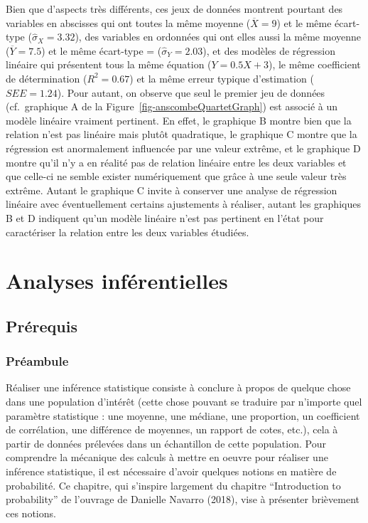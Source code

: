\documentclass[
  letterpaper,
]{book}
\begin{document}
Bien que d'aspects très différents, ces jeux de données montrent
pourtant des variables en abscisses qui ont toutes la même moyenne
(\(\overline{X} = 9\)) et le même écart-type
(\(\hat{\sigma}_{X} = 3.32\)), des variables en ordonnées qui ont elles
aussi la même moyenne (\(\overline{Y} = 7.5\)) et le même écart-type =
(\(\hat{\sigma}_{Y} = 2.03\)), et des modèles de régression linéaire qui
présentent tous la même équation (\(Y = 0.5X + 3\)), le même coefficient
de détermination (\(R^2 = 0.67\)) et la même erreur typique d'estimation
(\(SEE = 1.24\)). Pour autant, on observe que seul le premier jeu de
données (cf.~graphique A de la Figure~\ref{fig-anscombeQuartetGraph})
est associé à un modèle linéaire vraiment pertinent. En effet, le
graphique B montre bien que la relation n'est pas linéaire mais plutôt
quadratique, le graphique C montre que la régression est anormalement
influencée par une valeur extrême, et le graphique D montre qu'il n'y a
en réalité pas de relation linéaire entre les deux variables et que
celle-ci ne semble exister numériquement que grâce à une seule valeur
très extrême. Autant le graphique C invite à conserver une analyse de
régression linéaire avec éventuellement certains ajustements à réaliser,
autant les graphiques B et D indiquent qu'un modèle linéaire n'est pas
pertinent en l'état pour caractériser la relation entre les deux
variables étudiées.

\part{Analyses inférentielles}

\chapter{Prérequis}\label{pruxe9requis-1}

\section{Préambule}\label{pruxe9ambule}

Réaliser une inférence statistique consiste à conclure à propos de
quelque chose dans une population d'intérêt (cette chose pouvant se
traduire par n'importe quel paramètre statistique : une moyenne, une
médiane, une proportion, un coefficient de corrélation, une différence
de moyennes, un rapport de cotes, etc.), cela à partir de données
prélevées dans un échantillon de cette population. Pour comprendre la
mécanique des calculs à mettre en oeuvre pour réaliser une inférence
statistique, il est nécessaire d'avoir quelques notions en matière de
probabilité. Ce chapitre, qui s'inspire largement du chapitre
``Introduction to probability'' de l'ouvrage de Danielle Navarro (2018),
vise à présenter brièvement ces notions.
\end{document}

